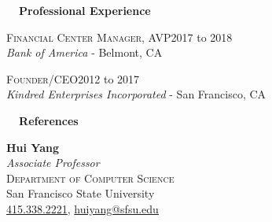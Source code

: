 \documentclass[hidelinks, 10pt]{article}
\begin{document}
{%
\vspace{7mm}
{\fontsize{14}{14}\selectfont \textbf{\ \ Professional Experience\ \ }}\hrulefill

\vspace{3mm}

\begin{minipage}[ct]{0.9\linewidth}
    \textsc{Financial Center Manager, AVP}\hfill 2017 to 2018\\
    {\emph{Bank of America} - Belmont, CA}
\end{minipage}

\vspace{2.5mm}

\begin{minipage}[ct]{0.9\linewidth}
    \textsc{Founder/CEO}\hfill 2012 to 2017\\
    {\emph{Kindred Enterprises Incorporated} - San Francisco, CA}
\end{minipage}





\vspace{7mm}


{\fontsize{14}{14}\selectfont \textbf{\ \ References\ \ }}\hrulefill

\vspace{3mm}

\begin{minipage}[ct]{0.9\linewidth}
    \begin{multicols*}{2}
        \textbf{Hui Yang}\\
        \emph{Associate Professor}\\
        \textsc{Department of Computer Science}\\
        San Francisco State University\\
        \href{tel:4153382221}{415.338.2221}, \href{mailto:huiyang@sfsu.edu}{huiyang@sfsu.edu}\\


\end{multicols*}
\end{minipage}}
\end{document}
